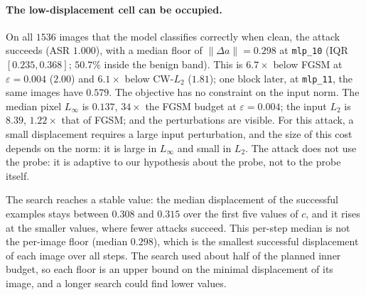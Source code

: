 \documentclass[../ppgc-tese.tex]{subfiles}
\begin{document}
\paragraph*{The low-displacement cell can be occupied.}
On all $1536$ images that the model classifies correctly when clean, the
attack succeeds (ASR $1.000$), with a median floor of
$\lVert\Delta a\rVert = 0.298$ at \texttt{mlp\_10} (IQR $[0.235, 0.368]$;
$50.7\%$ inside the benign band). This is $6.7\times$ below FGSM at
$\varepsilon{=}0.004$ ($2.00$) and $6.1\times$ below CW-$L_2$ ($1.81$); one
block later, at \texttt{mlp\_11}, the same images have $0.579$.
The objective has no constraint on the input norm. The median pixel $L_\infty$
is $0.137$, $34\times$ the FGSM budget at $\varepsilon{=}0.004$; the input
$L_2$ is $8.39$, $1.22\times$ that of FGSM; and the perturbations are visible.
For this attack, a small displacement requires a large input perturbation, and
the size of this cost depends on the norm: it is large in $L_\infty$ and small
in $L_2$. The attack does not use the probe: it is adaptive to our hypothesis
about the probe, not to the probe itself.

The search reaches a stable value: the median displacement of the successful
examples stays between $0.308$ and $0.315$ over the first five values of $c$,
and it rises at the smaller values, where fewer attacks succeed. This per-step
median is not the per-image floor (median $0.298$), which is the smallest
successful displacement of each image over all steps. The search used about
half of the planned inner budget, so each floor is an upper bound on the
minimal displacement of its image, and a longer search could find lower values.
\end{document}
